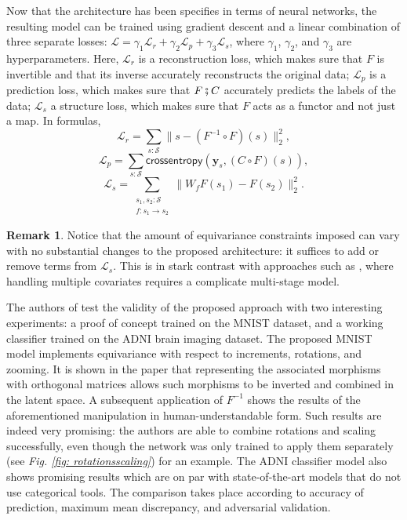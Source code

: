 \documentclass[11pt,a4paper,openright,twoside]{report}
\newcounter{mycounter}
\theoremstyle{plain}
\theoremstyle{definition}
\newtheorem{remark}[mycounter]{Remark}
\begin{document}
Now that the architecture has been specifies in terms of neural networks, the resulting model can be trained using gradient descent and a linear combination of three separate losses: $\mathcal{L} = \gamma_1\mathcal{L}_r + \gamma_2\mathcal{L}_p + \gamma_3\mathcal{L}_s$, where $\gamma_1$, $\gamma_2$, and $\gamma_3$ are hyperparameters. Here, $\mathcal{L}_r$ is a reconstruction loss, which makes sure that $F$ is invertible and that its inverse accurately reconstructs the original data; $\mathcal{L}_p$ is a prediction loss, which makes sure that $F \fatsemi C$ accurately predicts the labels of the data; $\mathcal{L}_s$ a structure loss, which makes sure that $F$ acts as a functor and not just a map. In formulas,
\[\mathcal{L}_r = \sum_{s : \mathcal{S}}\|s-(F^{-1} \circ F)(s)\|^2_2,\]
\[\mathcal{L}_p = \sum_{s : \mathcal{S}}\mathsf{crossentropy}(\mathbf{y}_s,(C \circ F)(s)),\]
\[\mathcal{L}_s = \sum_{\begin{smallmatrix}s_1, s_2 : \mathcal{S} \\ f: s_1 \to s_2 \end{smallmatrix}}\|W_fF(s_1)-F(s_2)\|^2_2.\]

\begin{remark}
  Notice that the amount of equivariance constraints imposed can vary with no substantial changes to the proposed architecture: it suffices to add or remove terms from $\mathcal{L}_s$. This is in stark contrast with approaches such as \cite{lokhande2022equivariance}, where handling multiple covariates requires a complicate multi-stage model. 
\end{remark}

The authors of \cite{chytas2024poolingimagedatasetsmultiple} test the validity of the proposed approach with two interesting experiments: a proof of concept trained on the MNIST dataset, and a working classifier trained on the ADNI brain imaging dataset. The proposed MNIST model implements equivariance with respect to increments, rotations, and zooming. It is shown in the paper that representing the associated morphisms with orthogonal matrices allows such morphisms to be inverted and combined in the latent space. A subsequent application of $F^{-1}$ shows the results of the aforementioned manipulation in human-understandable form. Such results are indeed very promising: the authors are able to combine rotations and scaling successfully, even though the network was only trained to apply them separately (see \textit{Fig. \ref{fig: rotationsscaling}}) for an example. The ADNI classifier model also shows promising results which are on par with state-of-the-art models that do not use categorical tools. The comparison takes place according to accuracy of prediction, maximum mean discrepancy, and adversarial validation.
\end{document}

